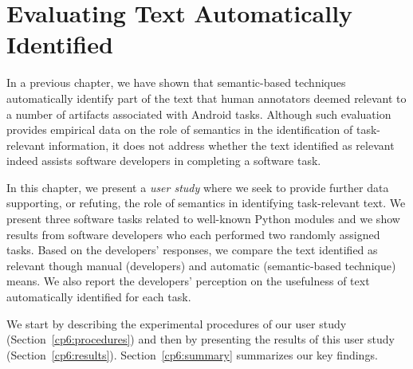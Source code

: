 \setcounter{chapter}{5}
\setcounter{rq}{1}


\chapter{Evaluating Text Automatically Identified}
\label{ch:assisting}







In a previous chapter, we have shown that semantic-based techniques automatically identify part of the text 
that human annotators deemed relevant to a number of artifacts associated with Android tasks.
Although such evaluation provides empirical data on the role of semantics in the identification of task-relevant information, it does not address whether the text identified as relevant indeed assists software developers in completing a software task.



In this chapter, we present a \textit{user study} where we seek to provide further data supporting, or refuting, the role of semantics in identifying task-relevant text. 
We present three software tasks related to well-known Python modules and we show 
results from  software developers who each performed two randomly assigned tasks. 
Based on the developers' responses, we compare the text identified as relevant though manual (developers)
and automatic (semantic-based technique) means. We also report the developers' perception on the usefulness of text automatically identified for each task. 


We start by describing the experimental procedures of our user study (Section~\ref{cp6:procedures}) and then by presenting the results of this user study  (Section~\ref{cp6:results}). Section~\ref{cp6:summary} summarizes our key findings.






